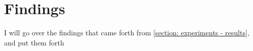 \section{Findings}
\label{section: discussion - findings}

I will go over the findings that came forth from \cref{section: experiments - results}, and put them forth
